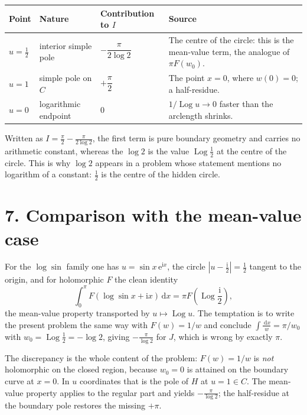\documentclass[12pt]{article}
\newcommand{\dd}{\,\mathrm{d}}
\newcommand{\ii}{\mathrm{i}}
\newcommand{\e}{\mathrm{e}}
\newcommand{\Log}{\operatorname{Log}}
\begin{document}
\begin{center}
\small
\renewcommand{\arraystretch}{1.45}
\begin{tabularx}{\textwidth}{@{}>{\raggedright\arraybackslash}p{}>{\raggedright\arraybackslash}p{}>{\raggedright\arraybackslash}p{}X@{}}
\toprule
Point & Nature & Contribution to \(I\) & Source \\
\midrule
\(u=\tfrac12\) & interior simple pole & \(-\dfrac{\pi}{2\log2}\) &
The centre of the circle: this is the mean-value term, the analogue of
\(\pi F(w_0)\). \\
\addlinespace
\(u=1\) & simple pole on \(C\) & \(+\dfrac{\pi}{2}\) &
The point \(x=0\), where \(w(0)=0\); a half-residue. \\
\addlinespace
\(u=0\) & logarithmic endpoint & \(0\) &
\(1/\Log u\to0\) faster than the arclength shrinks. \\
\bottomrule
\end{tabularx}
\end{center}

Written as \(I=\frac\pi2-\frac{\pi}{2\log2}\), the first term is pure
boundary geometry and carries no arithmetic constant, whereas the
\(\log2\) is the value \(\Log\frac12\) at the centre of the circle. This
is why \(\log 2\) appears in a problem whose statement mentions no
logarithm of a constant: \(\frac12\) is the centre of the hidden circle.

\section*{7. Comparison with the mean-value case}

For the \(\log\sin\) family one has \(u=\sin x\,\e^{\ii x}\), the circle
\(\left|u-\frac{\ii}2\right|=\frac12\) tangent to the origin, and for
holomorphic \(F\) the clean identity
\[
\int_0^\pi F(\log\sin x+\ii x)\dd x=\pi F\!\left(\Log\frac{\ii}{2}\right),
\]
the mean-value property transported by \(u\mapsto\Log u\). The temptation
is to write the present problem the same way with \(F(w)=1/w\) and
conclude \(\int\frac{\dd x}{w}=\pi/w_0\) with \(w_0=\Log\frac12=-\log2\),
giving \(-\frac{\pi}{\log2}\) for \(J\), which is wrong by exactly
\(\pi\).

The discrepancy is the whole content of the problem: \(F(w)=1/w\) is
\emph{not} holomorphic on the closed region, because \(w_0=0\) is
attained on the boundary curve at \(x=0\). In \(u\) coordinates that is
the pole of \(H\) at \(u=1\in C\). The mean-value property applies to the
regular part and yields \(-\frac{\pi}{\log 2}\); the half-residue at the
boundary pole restores the missing \(+\pi\).
\end{document}
